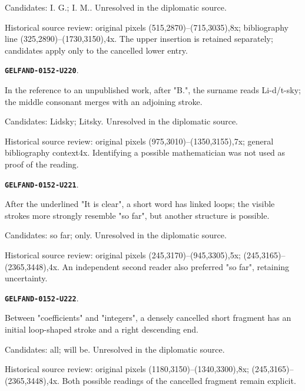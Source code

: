 \documentclass[11pt]{article}
\theoremstyle{definition}
\theoremstyle{remark}
\begin{document}
Candidates: I. G.; I. M.. Unresolved in the diplomatic source.\par
Historical source review: original pixels (515,2870)–(715,3035),8x; bibliography line (325,2890)–(1730,3150),4x. The upper insertion is retained separately; candidates apply only to the cancelled lower entry.\par\medskip
\par\noindent\leavevmode{}\label{GELFAND-0152-U220}\label{GELFAND-P001400:bibliography-last-name:note}\textbf{\texttt{GELFAND-0152-U220}}.\nopagebreak[4]\par
In the reference to an unpublished work, after "B.", the surname reads Li-d/t-sky; the middle consonant merges with an adjoining stroke.\par
Candidates: Lidsky; Litsky. Unresolved in the diplomatic source.\par
Historical source review: original pixels (975,3010)–(1350,3155),7x; general bibliography context4x. Identifying a possible mathematician was not used as proof of the reading.\par\medskip
\par\noindent\leavevmode{}\label{GELFAND-0152-U221}\label{GELFAND-P001400:penultimate-word:note}\textbf{\texttt{GELFAND-0152-U221}}.\nopagebreak[4]\par
After the underlined "It is clear", a short word has linked loops; the visible strokes more strongly resemble "so far", but another structure is possible.\par
Candidates: so far; only. Unresolved in the diplomatic source.\par
Historical source review: original pixels (245,3170)–(945,3305),5x; (245,3165)–(2365,3448),4x. An independent second reader also preferred "so far", retaining uncertainty.\par\medskip
\par\noindent\leavevmode{}\label{GELFAND-0152-U222}\label{GELFAND-P001400:cancelled-before-integers:note}\textbf{\texttt{GELFAND-0152-U222}}.\nopagebreak[4]\par
Between "coefficients" and "integers", a densely cancelled short fragment has an initial loop-shaped stroke and a right descending end.\par
Candidates: all; will be. Unresolved in the diplomatic source.\par
Historical source review: original pixels (1180,3150)–(1340,3300),8x; (245,3165)–(2365,3448),4x. Both possible readings of the cancelled fragment remain explicit.\par\medskip
\end{document}

